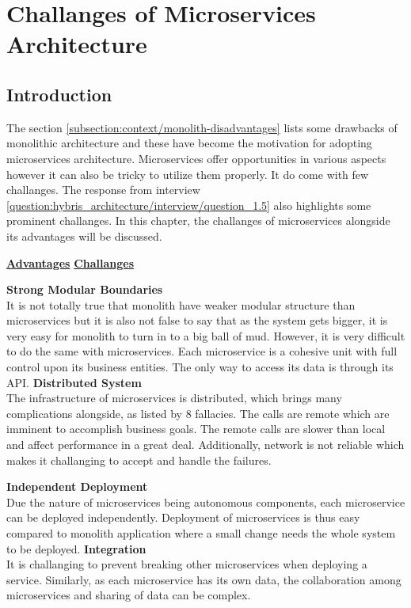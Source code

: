 \chapter{Challanges of Microservices Architecture}\label{chapter:challanges_of_microservices_architecture}
\section{Introduction}\label{section:challanges_of_microservices_architecture/introduction}
The section \ref{subsection:context/monolith-disadvantages} lists some drawbacks of monolithic architecture and these have become the motivation for adopting microservices architecture. Microservices offer opportunities in various aspects however it can also be tricky to utilize them properly. It do come with few challanges. The response from interview \ref{question:hybris_architecture/interview/question_1.5} also highlights some prominent challanges. In this chapter, the challanges of microservices alongside its advantages will be discussed. \cite{Fowler:2015aa}

  \begin{multicols}{2}
  \textbf{\underline{Advantages}} 
  \vfill
  \columnbreak
  \textbf{\underline{Challanges}}
  \end{multicols}
  \begin{multicols}{2}
  \textbf{Strong Modular Boundaries} \\It is not totally true that monolith have weaker modular structure than microservices but it is also not false to say that as the system gets bigger, it is very easy for monolith to turn in to a big ball of mud. However, it is very difficult to do the same with microservices. Each microservice is a cohesive unit with full control upon its business entities. The only way to access its data is through its \acrshort{API}.
  \vfill
  \columnbreak
  \textbf{Distributed System} \\The infrastructure of microservices is distributed, which brings many complications alongside, as listed by 8 fallacies.\cite{Factor:2014aa} The calls are remote which are imminent to accomplish business goals. The remote calls are slower than local and affect performance in a great deal. Additionally, network is not reliable which makes it challanging to accept and handle the failures.
  \end{multicols}

\begin{multicols}{2}
  \textbf{Independent Deployment} \\Due the nature of microservices being autonomous components, each microservice can be deployed independently. Deployment of microservices is thus easy compared to monolith application where a small change needs the whole system to be deployed.\cite{Newman:2015aa}
  \vfill
  \columnbreak
  \textbf{Integration} \\It is challanging to prevent breaking other microservices when deploying a service. Similarly, as each microservice has its own data, the collaboration among microservices and sharing of data can be complex.
   \end{multicols}
   
